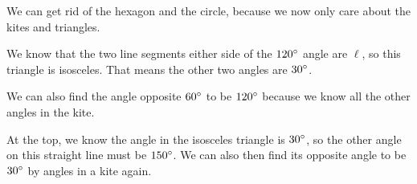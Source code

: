 \documentclass[a4paper]{article}
\begin{document}
We can get rid of the hexagon and the circle, because we now only care about the kites and triangles.

\vspace{0.5em}
\hspace{\fill}
\hspace{\fill}
\vspace{0.5em}

We know that the two line segments either side of the $120\degree$ angle are $\ell$, so this triangle is isosceles. That means the other two angles are $30\degree$.

We can also find the angle opposite $60\degree$ to be $120\degree$ because we know all the other angles in the kite.

At the top, we know the angle in the isosceles triangle is $30\degree$, so the other angle on this straight line must be $150\degree$. We can also then find its opposite angle to be $30\degree$ by angles in a kite again.
\end{document}
